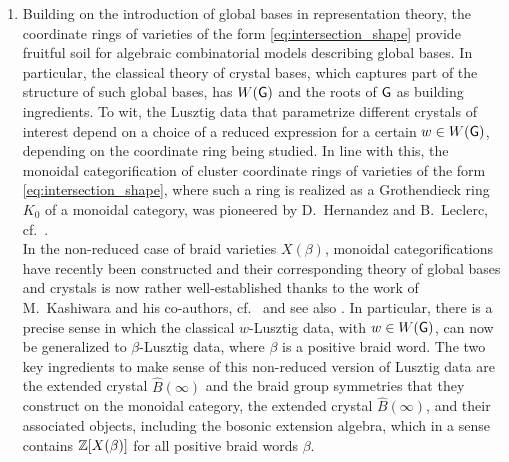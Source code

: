 \begin{enumerate}
\noindent Here the diagrammatic calculus of weaves, cf.~\cite{CasalsZaslow,CasalsWeng22,CGGJ24,CGGLSS25}, could be seen as generalizing the role played by the appropriate algebraic combinatorial objects in the reduced cases, e.g.~reduced plabic graphs in the case of positroids, or (tagged) triangulations in the case of cluster algebras associated to surfaces \cite{FG2006,FST08,FT12}. Thus an important feature of many Lie theoretic varieties, namely the existence of cluster algebra structures and diagrammatic combinatorics used to manipulate them, seems to still persist when we enter the non-reduced land through the lens of braid varieties.\\

\item Building on the introduction of global bases in representation theory, the coordinate rings of varieties of the form \eqref{eq:intersection_shape} provide fruitful soil for algebraic combinatorial models describing global bases. In particular, the classical theory of crystal bases, which captures part of the structure of such global bases, has $W(\mathsf{G})$ and the roots of $\mathsf{G}$ as building ingredients. To wit, the Lusztig data that parametrize different crystals of interest depend on a choice of a reduced expression for a certain $w\in W(\mathsf{G})$, depending on the coordinate ring being studied. In line with this, the monoidal categorification of cluster coordinate rings of varieties of the form \eqref{eq:intersection_shape}, where such a ring is realized as a Grothendieck ring $K_0$ of a monoidal category, was pioneered by D.~Hernandez and B.~Leclerc, cf.~\cite{MR2682185,MR3077685,MR3331727,MR3500832,MR3576119,MR4404353}.\\

In the non-reduced case of braid varieties $X(\beta)$, monoidal categorifications have recently been constructed and their corresponding theory of global bases and crystals is now rather well-established thanks to the work of M.~Kashiwara and his co-authors, cf.~\cite{KangKashiwaraKimOh2018Monoidal,KKOP2020Monoidal,KKOP2024MonoidalII,KKOP2025MonoidalIII,KKOP2024PBWAffine,KashiwaraPark2022CategoricalCrystals,Park2023ExtendedCrystals,OhPark2025BosonicPBW,KKOP2025GlobalBases,KKOP2024BraidSymmetries,KKOP2025Faithful} and see also \cite{Bi2026Quantization,Bi2026TwistedProducts,HuhJungKimPark2026Comparison}. In particular, there is a precise sense in which the classical $w$-Lusztig data, with $w\in W(\mathsf{G})$, can now be generalized to $\beta$-Lusztig data, where $\beta$ is a positive braid word. The two key ingredients to make sense of this non-reduced version of Lusztig data are the extended crystal $\widehat{B}(\infty)$ and the braid group symmetries that they construct on the monoidal category, the extended crystal $\widehat{B}(\infty)$, and their associated objects, including the bosonic extension algebra, which in a sense contains $\mathbb{Z}[X(\beta)]$ for all positive braid words $\beta$.\\


\end{enumerate}
